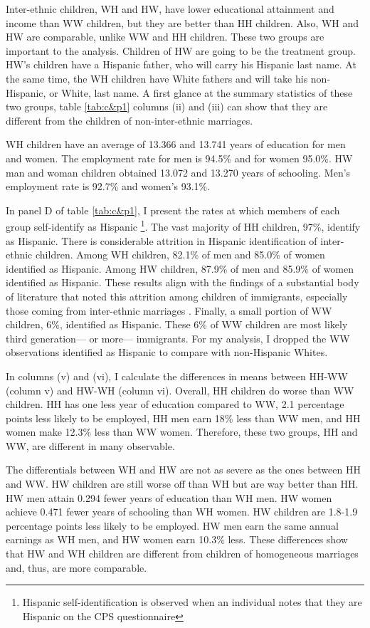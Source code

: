 \documentclass{wptemp}
\begin{document}
Inter-ethnic children, WH and HW, have lower educational attainment and income than WW children, but they are better than HH children. Also, WH and HW are comparable, unlike WW and HH children. These two groups are important to the analysis. Children of HW are going to be the treatment group. HW's children have a Hispanic father, who will carry his Hispanic last name. At the same time, the WH children have White fathers and will take his non-Hispanic, or White, last name. A first glance at the summary statistics of these two groups, table \ref{tab:c&p1} columns (ii) and (iii) can show that they are different from the children of non-inter-ethnic marriages. 

WH children have an average of 13.366 and 13.741 years of education for men and women. The employment rate for men is 94.5\% and for women 95.0\%. HW man and woman children obtained 13.072 and 13.270 years of schooling. Men's employment rate is 92.7\% and women's 93.1\%.

In panel D of table \ref{tab:c&p1}, I present the rates at which members of each group self-identify as Hispanic \footnote{Hispanic self-identification is observed when an individual notes that they are Hispanic on the CPS questionnaire}. The vast majority of HH children, 97\%, identify as Hispanic. There is considerable attrition in Hispanic identification of inter-ethnic children. Among WH children, 82.1\% of men and 85.0\% of women identified as Hispanic. Among HW children, 87.9\% of men and 85.9\% of women identified as Hispanic. These results align with the findings of a substantial body of literature that noted this attrition among children of immigrants, especially those coming from inter-ethnic marriages \citep{duncan2017complexity, duncan2018identifying, duncan2020new, antman2020ethnic}. Finally, a small portion of WW children, 6\%, identified as Hispanic. These 6\% of WW children are most likely third generation--- or more--- immigrants. For my analysis, I dropped the WW observations identified as Hispanic to compare with non-Hispanic Whites.

In columns (v) and (vi), I calculate the differences in means between HH-WW (column v) and HW-WH (column vi). Overall, HH children do worse than WW children. HH has one less year of education compared to WW, 2.1 percentage points less likely to be employed, HH men earn 18\% less than WW men, and HH women make 12.3\% less than WW women. Therefore, these two groups, HH and WW, are different in many observable.

The differentials between WH and HW are not as severe as the ones between HH and WW. HW children are still worse off than WH but are way better than HH. HW men attain 0.294 fewer years of education than WH men. HW women achieve 0.471 fewer years of schooling than WH women. HW children are 1.8-1.9 percentage points less likely to be employed. HW men earn the same annual earnings as WH men, and HW women earn 10.3\% less. These differences show that HW and WH children are different from children of homogeneous marriages and, thus, are more comparable.
\end{document}
